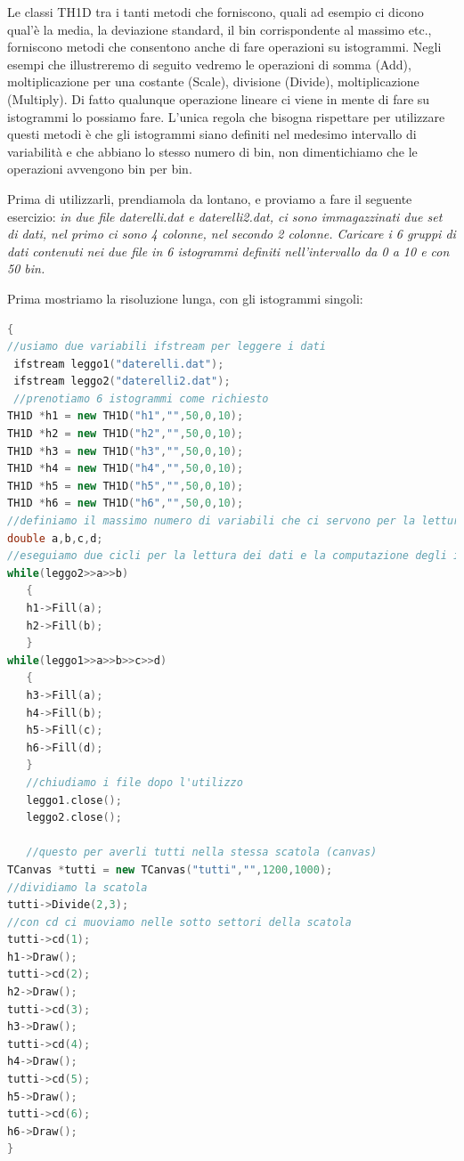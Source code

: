 \documentclass[11pt,fleqn]{book} %
\begin{document}
Le classi TH1D tra i tanti metodi che forniscono, quali ad esempio ci dicono qual'è la media, la deviazione standard, il bin corrispondente al massimo etc., forniscono metodi che consentono anche di fare operazioni su istogrammi.
Negli esempi che illustreremo di seguito vedremo le operazioni di somma (Add), moltiplicazione per una costante (Scale), divisione (Divide),
moltiplicazione (Multiply). Di fatto qualunque operazione lineare ci viene in mente di fare su istogrammi lo possiamo fare.
L'unica regola che bisogna rispettare per utilizzare questi metodi è che gli istogrammi siano definiti nel medesimo intervallo di variabilità e che abbiano lo stesso numero di bin, non dimentichiamo che le operazioni avvengono bin per bin.

Prima di utilizzarli, prendiamola da lontano, e proviamo a fare il seguente esercizio: \textit{in due file daterelli.dat e daterelli2.dat, ci sono immagazzinati due set di dati, nel primo ci sono 4 colonne, nel secondo 2 colonne. Caricare i 6 gruppi di dati contenuti nei due file in 6 istogrammi definiti nell'intervallo da 0 a 10 e con 50 bin.}

Prima mostriamo la risoluzione lunga, con gli istogrammi singoli:


\begin{lstlisting}[language=c++]
{
//usiamo due variabili ifstream per leggere i dati
 ifstream leggo1("daterelli.dat");
 ifstream leggo2("daterelli2.dat");
 //prenotiamo 6 istogrammi come richiesto
TH1D *h1 = new TH1D("h1","",50,0,10);
TH1D *h2 = new TH1D("h2","",50,0,10);
TH1D *h3 = new TH1D("h3","",50,0,10);
TH1D *h4 = new TH1D("h4","",50,0,10);
TH1D *h5 = new TH1D("h5","",50,0,10);
TH1D *h6 = new TH1D("h6","",50,0,10);
//definiamo il massimo numero di variabili che ci servono per la lettura
double a,b,c,d;
//eseguiamo due cicli per la lettura dei dati e la computazione degli istogrammi
while(leggo2>>a>>b)
   {
   h1->Fill(a);
   h2->Fill(b);
   }
while(leggo1>>a>>b>>c>>d)
   {
   h3->Fill(a);
   h4->Fill(b);
   h5->Fill(c);
   h6->Fill(d);
   }
   //chiudiamo i file dopo l'utilizzo
   leggo1.close();
   leggo2.close();
   
   //questo per averli tutti nella stessa scatola (canvas)
TCanvas *tutti = new TCanvas("tutti","",1200,1000);
//dividiamo la scatola
tutti->Divide(2,3);
//con cd ci muoviamo nelle sotto settori della scatola
tutti->cd(1);
h1->Draw();
tutti->cd(2);
h2->Draw();
tutti->cd(3);
h3->Draw();
tutti->cd(4);
h4->Draw();
tutti->cd(5);
h5->Draw();
tutti->cd(6);
h6->Draw();
}
\end{lstlisting}
\end{document}
